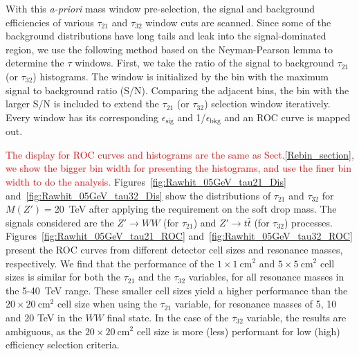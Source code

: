 With this {\it a-priori} mass window pre-selection, the signal and background efficiencies of 
various $\tau_{21}$ and $\tau_{32}$ window cuts are scanned. 
Since some of the background distributions have long tails and leak into the 
signal-dominated region, we use the following method based on the 
Neyman-Pearson lemma to determine the $\tau$ windows. 
First, we take the ratio of the signal to background $\tau_{21}$ (or $\tau_{32}$) 
histograms. The window is initialized by the bin with the maximum signal to 
background ratio (S/N).  
Comparing the adjacent bins,  the bin with the larger S/N is included  to extend the $\tau_{21}$ (or $\tau_{32}$) 
selection window iteratively.  Every window has its corresponding $\epsilon_\mathrm{sig}$ and 
1/$\epsilon_\mathrm{bkg}$ and an ROC curve is mapped out. 


\textcolor{red}{The display for ROC curves and histograms are the same as Sect.\ref{Rebin_section}, we show the bigger bin width for presenting the histograms, and use the finer bin width to do the analysis.} Figures~\ref{fig:Rawhit_05GeV_tau21_Dis} and~\ref{fig:Rawhit_05GeV_tau32_Dis} 
show the distributions of $\tau_{21}$ and $\tau_{32}$ for $M(Z')=20$~TeV 
after applying the requirement on the soft drop mass. The signals considered are 
the $Z'\rightarrow WW$ (for $\tau_{21}$) and 
$Z' \rightarrow t\bar{t}$ (for $\tau_{32}$) processes. 
Figures~\ref{fig:Rawhit_05GeV_tau21_ROC} and~\ref{fig:Rawhit_05GeV_tau32_ROC} 
present the ROC curves from different detector cell sizes and resonance masses, 
respectively. We find that the performance of the $1\times1~\mathrm{cm}^2$ and $5\times5~\mathrm{cm}^2$ cell sizes is similar for both the $ \tau_{21} $ and the $ \tau_{32} $ variables, for
 all resonance masses in the 5-40~TeV range. These smaller cell sizes yield a higher performance than 
 the $20\times20~\mathrm{cm}^2$ cell size when using the $ \tau_{21} $ variable, for resonance masses of 5, 10 and 20 TeV in the $WW$ final state. In the case of the $ \tau_{32} $ variable, 
  the results are ambiguous, as the $20\times20~\mathrm{cm}^2$ cell size is more (less) performant for low (high) efficiency selection criteria. 

